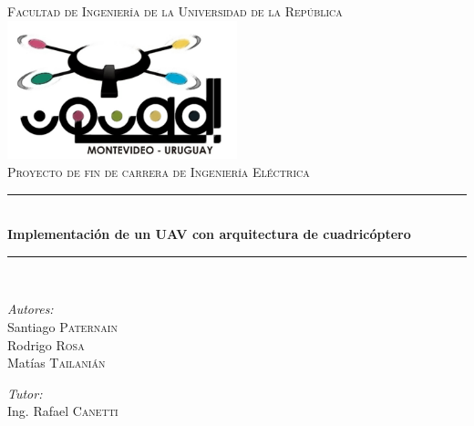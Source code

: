 \documentclass[main]{subfiles}
\newcommand{\HRule}{\rule{\linewidth}{0.5mm}}
\begin{document}
\begin{titlepage}

\begin{center}


  

\textsc{\LARGE Facultad de Ingenier\'ia de la Universidad de la Rep\'ublica}\\[1.5cm]
\includegraphics[width=0.50\textwidth]{./pics_portada/logo_portada.png}\\[1cm]  
\textsc{\Large Proyecto de fin de carrera de Ingenier\'ia El\'ectrica}\\[0.5cm]


\HRule \\[0.4cm]
{ \huge \bfseries Implementaci\'on de un UAV con arquitectura de cuadric\'optero}\\[0.4cm]

\HRule \\[1.5cm]

\begin{minipage}{0.4\textwidth}
\begin{flushleft} \large
\emph{Autores:}\\
Santiago \textsc{Paternain}\\
Rodrigo \textsc{Rosa}\\
Mat\'ias \textsc{Tailani\'an}
\end{flushleft}
\end{minipage}
\begin{minipage}{0.4\textwidth}
\begin{flushright} \large
\emph{Tutor:} \\
Ing. Rafael \textsc{Canetti}
\end{flushright}
\end{minipage}



\end{center}
\end{titlepage}
\end{document}
